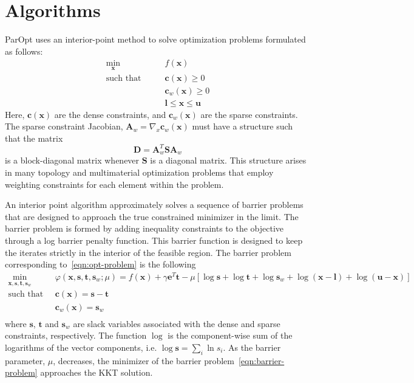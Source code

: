 \documentclass[12pt]{article}
\newcommand{\mb}{\mathbf}
\begin{document}
\section{Algorithms}

ParOpt uses an interior-point method to solve optimization problems formulated as follows:
\begin{equation}
  \label{eqn:opt-problem}
  \begin{aligned}
    \min_{\mb{x}} \qquad & f(\mb{x}) \\
    \text{such that} \qquad 
    & \mb{c}(\mb{x}) \ge 0 \\
    & \mb{c}_{w}(\mb{x}) \ge 0 \\
    & \mb{l} \le \mb{x} \le \mb{u}
  \end{aligned}
\end{equation}
Here, $\mb{c}(\mb{x})$ are the dense constraints, and $\mb{c}_{w}(\mb{x})$ are the sparse constraints. 
The sparse constraint Jacobian, $\mb{A}_{w} = \nabla_{x} \mb{c}_{w}(\mb{x})$ must have a structure such that the matrix
\begin{equation*}
  \mb{D} = \mb{A}_{w}^{T}\mb{S}\mb{A}_{w}
\end{equation*}
is a block-diagonal matrix whenever $\mb{S}$ is a diagonal matrix. 
This structure arises in many topology and multimaterial optimization problems that employ weighting constraints for each element within the problem. 

An interior point algorithm approximately solves a sequence of barrier problems that are designed to approach the true constrained minimizer in the limit.
The barrier problem is formed by adding inequality constraints to the objective through a log barrier penalty function. 
This barrier function is designed to keep the iterates strictly in the interior of the feasible region. 
The barrier problem corresponding to~\eqref{eqn:opt-problem} is the following
\begin{equation}
  \label{eqn:barrier-problem}
  \begin{aligned}
    \min_{\mb{x}, \mb{s}, \mb{t}, \mb{s}_{w}} \qquad &  \varphi(\mb{x}, \mb{s}, \mb{t}, \mb{s}_{w}; \mu) = f(\mb{x}) + \gamma \mb{e}^{T}\mb{t} - \mu \left[ \log \mb{s} + \log \mb{t} + \log \mb{s}_{w} + \log (\mb{x} - \mb{l}) + \log (\mb{u} - \mb{x})  \right] \\
    \text{such that} \qquad & \mb{c}(\mb{x}) = \mb{s} - \mb{t} \\
    & \mb{c}_{w}(\mb{x}) = \mb{s}_{w} \\
  \end{aligned}
\end{equation}
where $\mb{s}$, $\mb{t}$ and $\mb{s}_{w}$ are slack variables associated with the dense and sparse constraints, respectively. 
The function $\log$ is the component-wise sum of the logarithms of the vector components, i.e. $\log \mb{s} = \sum_{i} \ln s_{i}$.
As the barrier parameter, $\mu$, decreases, the minimizer of the barrier problem~\eqref{eqn:barrier-problem} approaches the KKT solution.
\end{document}
